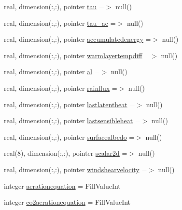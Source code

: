 \begin{DoxyCompactItemize}
real, dimension(\+:,\+:), pointer \mbox{\hyperlink{structmoduleinterfacewaterair_1_1t__interfacewaterair_a15597bd04749fe4386b6e09ce5fedc22}{tau}} =$>$ null()
\item 
real, dimension(\+:,\+:), pointer \mbox{\hyperlink{structmoduleinterfacewaterair_1_1t__interfacewaterair_a00c8bdec80dafc9b7b5045e723584805}{tau\+\_\+ac}} =$>$ null()
\item 
real, dimension(\+:,\+:), pointer \mbox{\hyperlink{structmoduleinterfacewaterair_1_1t__interfacewaterair_a1c577018b327b6653c9bb3f478e8f652}{accumulatedenergy}} =$>$ null()
\item 
real, dimension(\+:,\+:), pointer \mbox{\hyperlink{structmoduleinterfacewaterair_1_1t__interfacewaterair_acadc3dcae94bfbf01aadeb1d91e9afd4}{warmlayertempdiff}} =$>$ null()
\item 
real, dimension(\+:,\+:), pointer \mbox{\hyperlink{structmoduleinterfacewaterair_1_1t__interfacewaterair_a1a1256397c66db12a18d4b0dbe62b08b}{al}} =$>$ null()
\item 
real, dimension(\+:,\+:), pointer \mbox{\hyperlink{structmoduleinterfacewaterair_1_1t__interfacewaterair_a8075707bfb346b5d19f8cde2d8ed5e32}{rainflux}} =$>$ null()
\item 
real, dimension(\+:,\+:), pointer \mbox{\hyperlink{structmoduleinterfacewaterair_1_1t__interfacewaterair_afe4f1b7cf32cd586e89c3b5763aef0f7}{lastlatentheat}} =$>$ null()
\item 
real, dimension(\+:,\+:), pointer \mbox{\hyperlink{structmoduleinterfacewaterair_1_1t__interfacewaterair_a14939fa45708c7d0588e716de109d2dd}{lastsensibleheat}} =$>$ null()
\item 
real, dimension(\+:,\+:), pointer \mbox{\hyperlink{structmoduleinterfacewaterair_1_1t__interfacewaterair_ab790217cdeafb1bb260208d5191e8665}{surfacealbedo}} =$>$ null()
\item 
real(8), dimension(\+:,\+:), pointer \mbox{\hyperlink{structmoduleinterfacewaterair_1_1t__interfacewaterair_a01e2dc12aed7af405dc041b73be0fbf9}{scalar2d}} =$>$ null()
\item 
real, dimension(\+:,\+:), pointer \mbox{\hyperlink{structmoduleinterfacewaterair_1_1t__interfacewaterair_a9606611bb277a933979fe8bf6f85eb56}{windshearvelocity}} =$>$ null()
\item 
integer \mbox{\hyperlink{structmoduleinterfacewaterair_1_1t__interfacewaterair_a27d17295a65138bdd382a849ff9ac966}{aerationequation}} = Fill\+Value\+Int
\item 
integer \mbox{\hyperlink{structmoduleinterfacewaterair_1_1t__interfacewaterair_ae95adc8394537c6c0c17d221625af5c9}{co2aerationequation}} = Fill\+Value\+Int

\end{DoxyCompactItemize}
